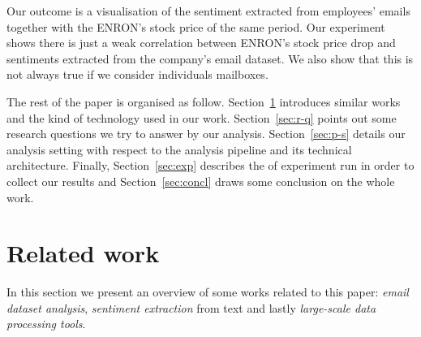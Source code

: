 \documentclass{vldb}
\begin{document}
Our outcome is a visualisation of the sentiment extracted from employees' emails together with the ENRON's stock price of the same period.
Our experiment shows there is just a weak correlation between ENRON's stock
price drop and sentiments extracted from the company's email dataset.
We also show that this is not always true if we consider individuals mailboxes.

The rest of the paper is organised as follow.
Section~\ref{sec:r-w} introduces similar works and the kind of technology used in our work.
Section~\ref{sec:r-q} points out some research questions we try to answer by our analysis.
Section~\ref{sec:p-s} details our analysis setting with respect to the analysis pipeline and its technical architecture. 
Finally, Section~\ref{sec:exp} describes the of experiment run in order to collect our results and Section~\ref{sec:concl} draws some conclusion on the whole work.



\section{Related work}
\label{sec:r-w}
In this section we present an overview of some works related to this paper:
\textit{email dataset analysis}, \textit{sentiment extraction} from text and lastly \textit{large-scale data processing tools}.
\end{document}
